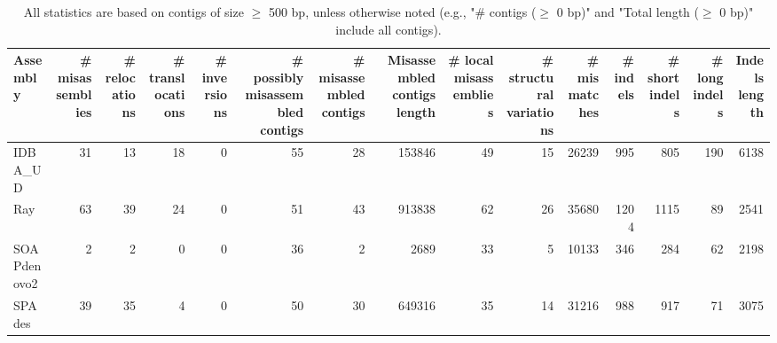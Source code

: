 \documentclass[12pt,a4paper]{article}
\begin{document}
\begin{table}[ht]
\begin{center}
\caption{All statistics are based on contigs of size $\geq$ 500 bp, unless otherwise noted (e.g., "\# contigs ($\geq$ 0 bp)" and "Total length ($\geq$ 0 bp)" include all contigs).}
\begin{tabular}{|l*{14}{|r}|}
\hline
Assembly & \# misassemblies &     \# relocations &     \# translocations &     \# inversions & \# possibly misassembled contigs & \# misassembled contigs & Misassembled contigs length & \# local misassemblies & \# structural variations & \# mismatches & \# indels &     \# short indels &     \# long indels & Indels length \\ \hline
IDBA\_UD & 31 & 13 & 18 & 0 & 55 & 28 & 153846 & 49 & 15 & 26239 & 995 & 805 & 190 & 6138 \\ \hline
Ray & 63 & 39 & 24 & 0 & 51 & 43 & 913838 & 62 & 26 & 35680 & 1204 & 1115 & 89 & 2541 \\ \hline
SOAPdenovo2 & 2 & 2 & 0 & 0 & 36 & 2 & 2689 & 33 & 5 & 10133 & 346 & 284 & 62 & 2198 \\ \hline
SPAdes & 39 & 35 & 4 & 0 & 50 & 30 & 649316 & 35 & 14 & 31216 & 988 & 917 & 71 & 3075 \\ \hline
\end{tabular}
\end{center}
\end{table}
\end{document}
